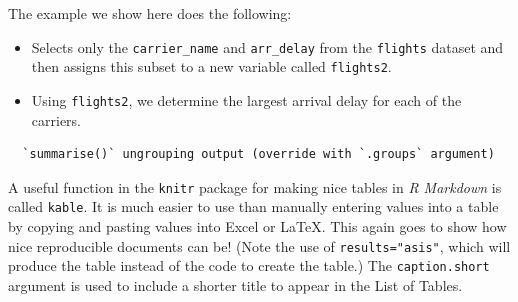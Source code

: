 \documentclass[12pt,msc,a4paper,twoside]{ucl_thesis}
\begin{document}
  The example we show here does the following:
  \begin{itemize}
  \item
    Selects only the \texttt{carrier\_name} and \texttt{arr\_delay} from the \texttt{flights} dataset and then assigns this subset to a new variable called \texttt{flights2}.
  \item
    Using \texttt{flights2}, we determine the largest arrival delay for each of the carriers.
  \end{itemize}
  \begin{Shaded}
  \end{Shaded}
  \begin{verbatim}
  `summarise()` ungrouping output (override with `.groups` argument)
  \end{verbatim}
  A useful function in the \texttt{knitr} package for making nice tables in \emph{R Markdown} is called \texttt{kable}. It is much easier to use than manually entering values into a table by copying and pasting values into Excel or LaTeX. This again goes to show how nice reproducible documents can be! (Note the use of \texttt{results="asis"}, which will produce the table instead of the code to create the table.) The \texttt{caption.short} argument is used to include a shorter title to appear in the List of Tables.
  \begin{Shaded}
  \begin{Highlighting}[]
         \NormalTok{(}\NormalTok{, }\NormalTok{),}
         \NormalTok{,}
         \NormalTok{,}
         \NormalTok{,}
         \NormalTok{)}
  \end{Highlighting}
  \end{Shaded}
\end{document}
